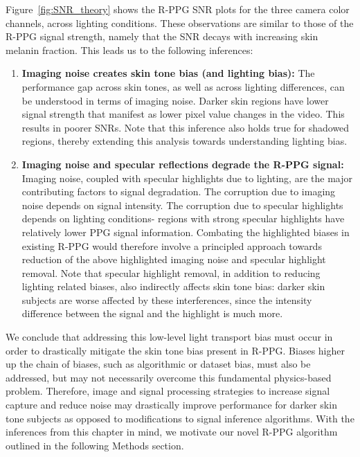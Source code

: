 Figure~\ref{fig:SNR_theory} shows the R-PPG SNR plots for the three camera color channels, across lighting conditions. These observations are similar to those of the R-PPG signal strength, namely that the SNR decays with increasing skin melanin fraction. This leads us to the following inferences: 
\begin{enumerate}[label=(\roman*)]
    \item \textbf{Imaging noise creates skin tone bias (and lighting bias):} The performance gap across skin tones, as well as across lighting differences, can be understood in terms of imaging noise. Darker skin regions have lower signal strength that manifest as lower pixel value changes in the video. This results in poorer SNRs. Note that this inference also holds true for shadowed regions, thereby extending this analysis towards understanding lighting bias.
    \item \textbf{Imaging noise and specular reflections degrade the R-PPG signal:} Imaging noise, coupled with specular highlights due to lighting, are the major contributing factors to signal degradation. The corruption due to imaging noise depends on signal intensity. The corruption due to specular highlights depends on lighting conditions- regions with strong specular highlights have relatively lower PPG signal information. Combating the highlighted biases in existing R-PPG would therefore involve a principled approach towards reduction of the above highlighted imaging noise and specular highlight removal. Note that specular highlight removal, in addition to reducing lighting related biases, also indirectly affects skin tone bias: darker skin subjects are worse affected by these interferences, since the intensity difference between the signal and the highlight is much more. 
\end{enumerate}

We conclude that addressing this low-level light transport bias must occur in order to drastically mitigate the skin tone bias present in R-PPG. Biases higher up the chain of biases, such as algorithmic or dataset bias, must also be addressed, but may not necessarily overcome this fundamental physics-based problem. Therefore, image and signal processing strategies to increase signal capture and reduce noise may drastically improve performance for darker skin tone subjects as opposed to modifications to signal inference algorithms. With the inferences from this chapter in mind, we motivate our novel R-PPG algorithm outlined in the following Methods section.

